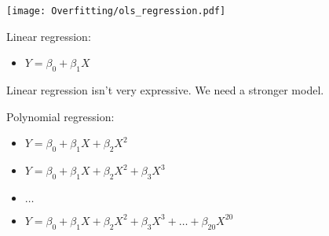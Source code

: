 \documentclass[xcolor=pdftex,dvipsnames,table]{beamer}
\begin{document}
\frame
{
	\begin{center}
		\texttt{[image: Overfitting/ols\_regression.pdf]}
	\end{center}
}

\frame
{
	Linear regression:
	\begin{itemize}
		\item{$Y = \beta_{0} + \beta_{1} X$}
	\end{itemize}
}

\frame
{
	Linear regression isn't very expressive. We need a stronger model.
}

\frame
{
	Polynomial regression:
	\begin{itemize}
		\item{$Y = \beta_{0} + \beta_{1} X + \beta_{2} X ^ 2$}
		\item{$Y = \beta_{0} + \beta_{1} X + \beta_{2} X ^ 2 + \beta_{3} X ^ 3$}
		\item{$\ldots$}
		\item{$Y = \beta_{0} + \beta_{1} X + \beta_{2} X ^ 2 + \beta_{3} X ^ 3 + \ldots + \beta_{20} X ^ {20}$}
	\end{itemize}
}
\end{document}
